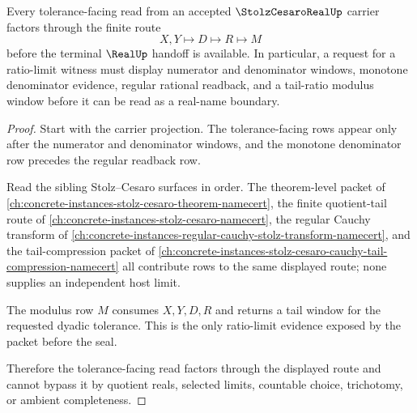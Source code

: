 \begin{theorem}
\label{thm:stolz-cesaro-real-tail-ratio-window}
Every tolerance-facing read from an accepted $\StolzCesaroRealUp$ carrier factors through the finite route
$$
X,Y\longmapsto D\longmapsto R\longmapsto M
$$
before the terminal $\RealUp$ handoff is available. In particular, a request for a ratio-limit witness must display numerator and denominator windows, monotone denominator evidence, regular rational readback, and a tail-ratio modulus window before it can be read as a real-name boundary.
\end{theorem}
\begin{proof}
Start with the carrier projection. The tolerance-facing rows appear only after the numerator and denominator windows, and the monotone denominator row precedes the regular readback row.

Read the sibling Stolz--Cesaro surfaces in order. The theorem-level packet of \autoref{ch:concrete-instances-stolz-cesaro-theorem-namecert}, the finite quotient-tail route of \autoref{ch:concrete-instances-stolz-cesaro-namecert}, the regular Cauchy transform of \autoref{ch:concrete-instances-regular-cauchy-stolz-transform-namecert}, and the tail-compression packet of \autoref{ch:concrete-instances-stolz-cesaro-cauchy-tail-compression-namecert} all contribute rows to the same displayed route; none supplies an independent host limit.

The modulus row $M$ consumes $X,Y,D,R$ and returns a tail window for the requested dyadic tolerance. This is the only ratio-limit evidence exposed by the packet before the seal.

Therefore the tolerance-facing read factors through the displayed route and cannot bypass it by quotient reals, selected limits, countable choice, trichotomy, or ambient completeness.
\end{proof}

